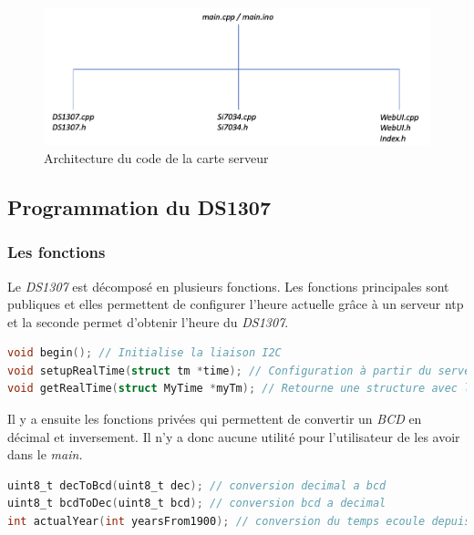             \clearpage
            \begin{figure}[!h]
                \begin{center}
                    \includegraphics[width=.8\textwidth]{img/code/archi_server.png}
                    \caption{\label{fig:archi_server}Architecture du code de la carte serveur}  
                \end{center}
            \end{figure}





        \subsection{Programmation du DS1307}
            \subsubsection{Les fonctions}


            Le \textit{DS1307} est décomposé en plusieurs fonctions. Les fonctions principales sont publiques et elles permettent de configurer l'heure actuelle grâce à un serveur ntp
            et la seconde permet d'obtenir l'heure du \textit{DS1307}.

\begin{lstlisting}[style=myC, caption=Fonctions publiques de la librairie DS1307, language=C, frame=lines]
void begin(); // Initialise la liaison I2C
void setupRealTime(struct tm *time); // Configuration à partir du serveur ntp 
void getRealTime(struct MyTime *myTm); // Retourne une structure avec l'heure du RTC
\end{lstlisting}

        \vspace{.5 cm}

        Il y a ensuite les fonctions privées qui permettent de convertir un \textit{BCD} en décimal et inversement. Il n'y a donc aucune utilité pour l'utilisateur de les avoir dans le \textit{main.}

\begin{lstlisting}[style=myC, caption=Fonctions privées de la librairie DS1307, language=C, frame=lines]
uint8_t decToBcd(uint8_t dec); // conversion decimal a bcd
uint8_t bcdToDec(uint8_t bcd); // conversion bcd a decimal
int actualYear(int yearsFrom1900); // conversion du temps ecoule depuis 1900
\end{lstlisting}


